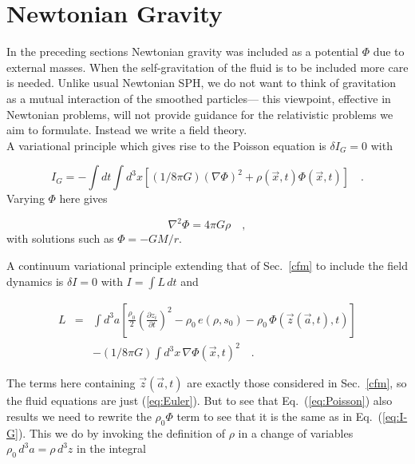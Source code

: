 \documentclass{article}
\def\a{{\vec a}}
\def\x{{\vec x}}
\def\z{{\vec z}}
\def\.{{\quad .}}
\def\_,{{\quad ,}}
\begin{document}
\section{Newtonian Gravity}\label{Newton}

In the preceding sections Newtonian gravity was included as a potential $\Phi$
due to external masses.  When the self-gravitation of the fluid is to be
included more care is needed.  Unlike usual Newtonian SPH, we do not want to
think of gravitation as a mutual interaction of the smoothed particles---
this viewpoint, effective in Newtonian problems, will not provide guidance
for the relativistic problems we aim to formulate.  Instead we write a
field theory.\\

A variational principle which gives rise to the Poisson equation is
$\delta I_G = 0$ with

\begin{equation}\label{eq:I-G}
    I_G = -\int\!\!dt\!\int\!\!d^3x \left[
            (1/8\pi G)(\nabla \Phi)^2 + \rho(\x,t) \Phi(\x,t) \right] \.
\end{equation}
%
Varying $\Phi$ here gives

\begin{equation}\label{eq:Poisson}
    \nabla^2 \Phi = 4 \pi G \rho  \_,
\end{equation}
%
with solutions such as $\Phi = -GM/r$.

A continuum variational principle extending that of Sec.~\ref{cfm} to include
the field dynamics is $\delta I = 0$ with $I = \int\!L\,dt$ and

\begin{eqnarray}\label{eq:full-L}
    L & = & \int\!\! d^3a \left[\frac{\rho_0}{2} \left(
        \frac{\partial z_i}{\partial t}\right)^2
      - \rho_0\, e(\rho,s_0) - \rho_0\, \Phi(\z(\a,t),t) \right]
       \nonumber \\
      & & - (1/8\pi G)\int\!\!d^3x\,\nabla \Phi(\x,t)^2  \.
\end{eqnarray}

The terms here containing $\z(\a,t)$ are exactly those considered in
Sec.~\ref{cfm}, so the fluid equations are just (\ref{eq:Euler}).  But to see
that Eq.~(\ref{eq:Poisson}) also results we need to rewrite the $\rho_0\Phi$
term to see that it is the same as in Eq.~(\ref{eq:I-G}).  This we do by
invoking the definition of $\rho$ in a change of variables $\rho_0\,d^3a
= \rho\,d^3z$ in the integral
\end{document}

